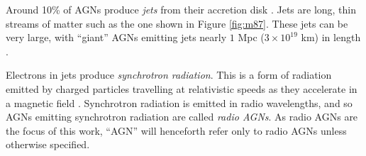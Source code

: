         Around 10\% of AGNs produce \emph{jets} from their accretion disk
        \citep{fabian99}. Jets are long, thin streams of matter such as the one
        shown in Figure \ref{fig:m87}. These jets can be very large, with
        ``giant'' AGNs emitting jets nearly $1$ Mpc ($3 \times 10^{19}$ km) in
        length \citep{saripalli05}.

        Electrons in jets produce \emph{synchrotron radiation}. This is a
        form of radiation emitted by charged particles travelling at
        relativistic speeds as they accelerate in a magnetic field
        \citep{sokolov67}. Synchrotron radiation is emitted in radio
        wavelengths, and so AGNs emitting synchrotron radiation are called
        \emph{radio AGNs}. As radio AGNs are the focus of this work, ``AGN''
        will henceforth refer only to radio AGNs unless otherwise specified.

